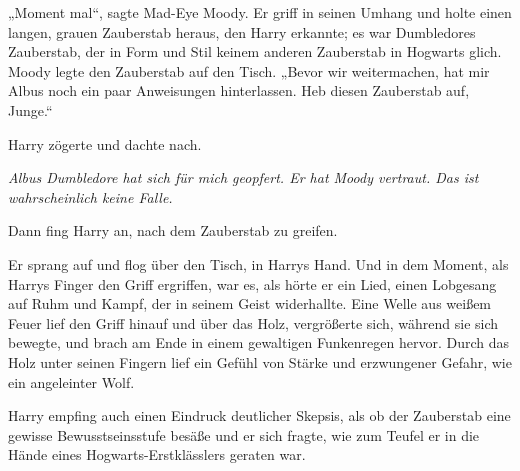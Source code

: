 „Moment mal“, sagte Mad-Eye Moody.
Er griff in seinen Umhang und holte einen langen, grauen Zauberstab heraus, den Harry erkannte; es war Dumbledores Zauberstab, der in Form und Stil keinem anderen Zauberstab in Hogwarts glich.
Moody legte den Zauberstab auf den Tisch.
„Bevor wir weitermachen, hat mir Albus noch ein paar Anweisungen hinterlassen. Heb diesen Zauberstab auf, Junge.“

Harry zögerte und dachte nach.

\emph{Albus Dumbledore hat sich für mich geopfert. Er hat Moody vertraut. Das ist wahrscheinlich keine Falle.}

Dann fing Harry an, nach dem Zauberstab zu greifen.

Er sprang auf und flog über den Tisch, in Harrys Hand. Und in dem Moment, als Harrys Finger den Griff ergriffen, war es, als hörte er ein Lied, einen Lobgesang auf Ruhm und Kampf, der in seinem Geist widerhallte. Eine Welle aus weißem Feuer lief den Griff hinauf und über das Holz, vergrößerte sich, während sie sich bewegte, und brach am Ende in einem gewaltigen Funkenregen hervor. Durch das Holz unter seinen Fingern lief ein Gefühl von Stärke und erzwungener Gefahr, wie ein angeleinter Wolf.

Harry empfing auch einen Eindruck deutlicher Skepsis, als ob der Zauberstab eine gewisse Bewusstseinsstufe besäße und er sich fragte, wie zum Teufel er in die Hände eines Hogwarts-Erstklässlers geraten war.


